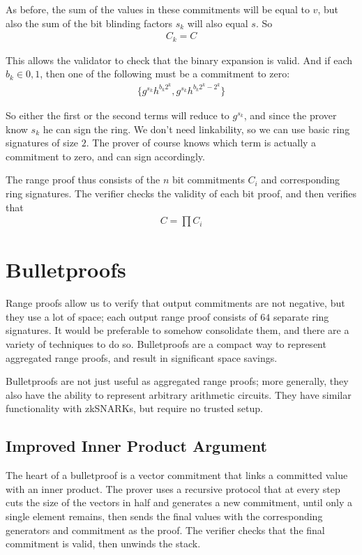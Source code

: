 \documentclass{article}
\begin{document}
As before, the sum of the values in these commitments will be equal to $v$, but also the sum of the bit blinding factors $s_k$ will also equal $s$.  So
\begin{align}
  C_k = C
\end{align}

This allows the validator to check that the binary expansion is valid.  And if each $b_k \in {0, 1}$, then one of the following must be a commitment to zero:
\begin{align}
  \{g^{s_k} h^{b_k 2^k}, g^{s_k} h^{b_k 2^k - 2^k}\}
\end{align}

So either the first or the second terms will reduce to $g^{s_k}$, and since the prover know $s_k$ he can sign the ring.  We don't need linkability, so we can use basic ring signatures of size $2$. The prover of course knows which term is actually a commitment to zero, and can sign accordingly.

The range proof thus consists of the $n$ bit commitments $C_i$ and corresponding ring signatures.  The verifier checks the validity of each bit proof, and then verifies that
\begin{align}
  C = \prod{C_i}
\end{align}



\section{Bulletproofs}

Range proofs allow us to verify that output commitments are not negative, but they use a lot of space; each output range proof consists of $64$ separate ring signatures.  It would be preferable to somehow consolidate them, and there are a variety of techniques to do so.  Bulletproofs \cite{bulletproofs} are a compact way to represent aggregated range proofs, and result in significant space savings.

Bulletproofs are not just useful as aggregated range proofs; more generally, they also have the ability to represent arbitrary arithmetic circuits.  They have similar functionality with zkSNARKs, but require no trusted setup.


\subsection{Improved Inner Product Argument}

The heart of a bulletproof is a vector commitment that links a committed value with an inner product.  The prover uses a recursive protocol that at every step cuts the size of the vectors in half and generates a new commitment, until only a single element remains, then sends the final values with the corresponding generators and commitment as the proof.  The verifier checks that the final commitment is valid, then unwinds the stack.
\end{document}
